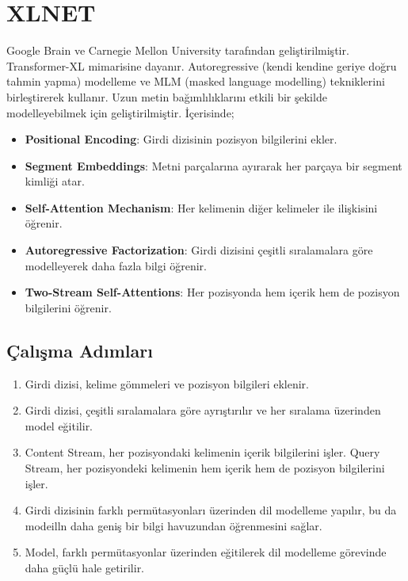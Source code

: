 \section{XLNET}
Google Brain ve Carnegie Mellon University tarafından geliştirilmiştir. Transformer-XL mimarisine dayanır. Autoregressive (kendi kendine geriye doğru tahmin yapma) modelleme ve MLM (masked language modelling) tekniklerini birleştirerek kullanır. Uzun metin bağımlılıklarını etkili bir şekilde modelleyebilmek için geliştirilmiştir. İçerisinde;

\begin{itemize}
	\item \textbf{Positional Encoding}: Girdi dizisinin pozisyon bilgilerini ekler.
	\item \textbf{Segment Embeddings}: Metni parçalarına ayırarak her parçaya bir segment kimliği atar.
	\item \textbf{Self-Attention Mechanism}: Her kelimenin diğer kelimeler ile ilişkisini öğrenir.
	\item \textbf{Autoregressive Factorization}: Girdi dizisini çeşitli sıralamalara göre modelleyerek daha fazla bilgi öğrenir.
	\item \textbf{Two-Stream Self-Attentions}: Her pozisyonda hem içerik hem de pozisyon bilgilerini öğrenir. 
\end{itemize}

\subsection{Çalışma Adımları}
\begin{enumerate}
	\item Girdi dizisi, kelime gömmeleri ve pozisyon bilgileri eklenir.
	\item Girdi dizisi, çeşitli sıralamalara göre ayrıştırılır ve her sıralama üzerinden model eğitilir.
	\item Content Stream, her pozisyondaki kelimenin içerik bilgilerini işler. Query Stream, her pozisyondeki kelimenin hem içerik hem de pozisyon bilgilerini işler.
	\item Girdi dizisinin farklı permütasyonları üzerinden dil modelleme yapılır, bu da modeilln daha geniş bir bilgi havuzundan öğrenmesini sağlar.
	\item Model, farklı permütasyonlar üzerinden eğitilerek dil modelleme görevinde daha güçlü hale getirilir.
\end{enumerate}

\newpage
